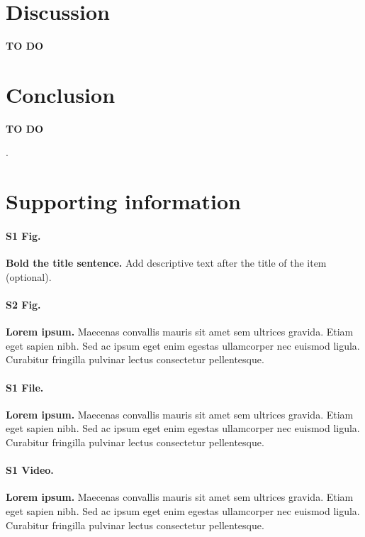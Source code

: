 \documentclass[10pt,letterpaper]{article}
\begin{document}
\section*{Discussion}
\textbf{TO DO}


\section*{Conclusion}
\textbf{TO DO}


 
 
.

\section*{Supporting information}

\paragraph*{S1 Fig.}
\label{S1_Fig}
{\bf Bold the title sentence.} Add descriptive text after the title of the item (optional).

\paragraph*{S2 Fig.}
\label{S2_Fig}
{\bf Lorem ipsum.} Maecenas convallis mauris sit amet sem ultrices gravida. Etiam eget sapien nibh. Sed ac ipsum eget enim egestas ullamcorper nec euismod ligula. Curabitur fringilla pulvinar lectus consectetur pellentesque.

\paragraph*{S1 File.}
\label{S1_File}
{\bf Lorem ipsum.}  Maecenas convallis mauris sit amet sem ultrices gravida. Etiam eget sapien nibh. Sed ac ipsum eget enim egestas ullamcorper nec euismod ligula. Curabitur fringilla pulvinar lectus consectetur pellentesque.

\paragraph*{S1 Video.}
\label{S1_Video}
{\bf Lorem ipsum.}  Maecenas convallis mauris sit amet sem ultrices gravida. Etiam eget sapien nibh. Sed ac ipsum eget enim egestas ullamcorper nec euismod ligula. Curabitur fringilla pulvinar lectus consectetur pellentesque.
\end{document}
